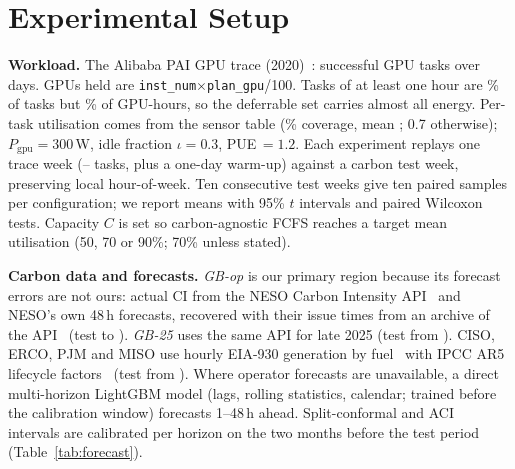 \section{Experimental Setup}\label{sec:setup}

\textbf{Workload.} The Alibaba PAI GPU trace (2020)~\cite{weng2022mlaas,alibaba2020gputrace}:
 successful GPU tasks over  days.
GPUs held are \texttt{inst\_num}$\times$\texttt{plan\_gpu}/100. Tasks of at least one hour are
\% of tasks but \% of
GPU-hours, so the deferrable set carries almost all energy. Per-task utilisation comes from the sensor table
(\% coverage, mean ; 0.7 otherwise);
$P_{\mathrm{gpu}}{=}300$\,W, idle fraction $\iota{=}0.3$, PUE\,$=1.2$.
Each experiment replays one trace week (--
tasks, plus a one-day warm-up) against a carbon test week, preserving local hour-of-week. Ten
consecutive test weeks give ten paired samples per configuration; we report means with 95\% $t$
intervals and paired Wilcoxon tests. Capacity $C$ is set so carbon-agnostic FCFS reaches a target
mean utilisation (50, 70 or 90\%; 70\% unless stated).

\textbf{Carbon data and forecasts.}
\emph{GB-op} is our primary region because its forecast errors are not ours: actual CI from the
NESO Carbon Intensity API~\cite{ciapi} and NESO's own 48\,h forecasts, recovered with their issue
times from an archive of the API~\cite{powell_citracking}
(test  to ).
\emph{GB-25} uses the same API for late 2025 (test from ). CISO, ERCO,
PJM and MISO use hourly EIA-930 generation by fuel~\cite{eia930} with IPCC AR5 lifecycle
factors~\cite{schlomer2014annexiii} (test from ).
Where operator forecasts are unavailable, a direct multi-horizon LightGBM model (lags, rolling
statistics, calendar; trained before the calibration window) forecasts 1--48\,h ahead.
Split-conformal and ACI~\cite{gibbs2021aci} intervals are calibrated per horizon on the two months
before the test period (Table~\ref{tab:forecast}).

